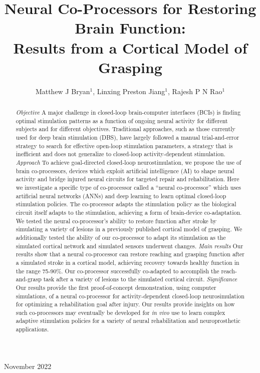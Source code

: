 \documentclass[12pt]{iopart}
\begin{document}
\title[Neural Co-Processors]
{Neural Co-Processors for Restoring Brain Function:\\Results from a Cortical Model of Grasping}

\author{Matthew J Bryan$^{1}$, Linxing Preston Jiang$^{1}$, Rajesh P N Rao$^{1}$}

\address{$^{1}$ Neural Systems Laboratory, Paul G. Allen School of Computer
Science \& Engineering, University of Washington, Box 352350,
Seattle, WA 98105, USA}

\vspace{10pt}
\begin{indented}
\item[]November 2022
\end{indented}

\begin{abstract}
\textit{Objective} A major challenge in closed-loop brain-computer interfaces (BCIs)
is finding optimal stimulation patterns as a function of ongoing neural activity for
different subjects and for different objectives. Traditional approaches, such as
those currently used for deep brain stimulation (DBS), have largely followed a manual
trial-and-error strategy to search for effective open-loop stimulation parameters,
a strategy that is inefficient and does not generalize to closed-loop
activity-dependent stimulation.
\textit{Approach} To achieve goal-directed closed-loop neurostimulation, we propose
the use of brain co-processors, devices which exploit artificial intelligence (AI)
to shape neural activity and bridge injured neural circuits for targeted repair and
rehabilitation.  Here we investigate a specific type of co-processor called a ``neural
co-processor'' which uses artificial neural networks (ANNs) and deep learning to learn optimal
closed-loop stimulation policies. The co-processor adapts the stimulation policy as
the biological circuit itself adapts to the stimulation, achieving a form of brain-device
co-adaptation. We tested the neural co-processor's ability to restore function after
stroke by simulating a variety of lesions in a previously published cortical model
of grasping.  We additionally tested the ability of our co-processor
to adapt its stimulation as the simulated cortical network and simulated sensors
underwent changes.
\textit{Main results} Our results show that a neural co-processor can restore
reaching and grasping function after a simulated stroke in a cortical model, achieving
recovery towards healthy function in the range 75-90\%. Our co-processor successfully
co-adapted to accomplish the reach-and-grasp task after a variety of lesions to the
simulated cortical circuit.
\textit{Significance} Our results provide the first proof-of-concept demonstration,
using computer simulations, of a neural co-processor for activity-dependent closed-loop
neurosimulation for optimizing a rehabilitation goal after injury. Our results provide
insights on how such co-processors may eventually be developed for \textit{in vivo} use
to learn complex adaptive stimulation policies for a variety of neural rehabilitation
and neuroprosthetic applications. 
\end{abstract}
\end{document}
